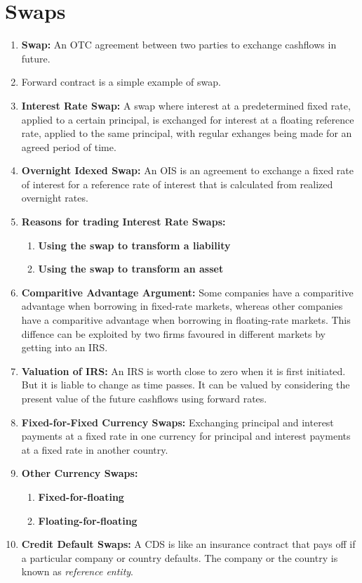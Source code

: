 
\section{Swaps}

\begin{enumerate}
    \item \textbf{Swap:} An OTC agreement between two parties to exchange cashflows in future.
    \item Forward contract is a simple example of swap.
    \item \textbf{Interest Rate Swap:} A swap where interest at a predetermined fixed rate, applied to a certain principal, is exchanged for interest at a floating reference rate, applied to the same principal, with regular exhanges being made for an agreed period of time.
    \item \textbf{Overnight Idexed Swap:} An OIS is an agreement to exchange a fixed rate of interest for a reference rate of interest that is calculated from realized overnight rates.
    \item \textbf{Reasons for trading Interest Rate Swaps:}
    \begin{enumerate}
        \item \textbf{Using the swap to transform a liability}
        \item \textbf{Using the swap to transform an asset}
    \end{enumerate}
    \item \textbf{Comparitive Advantage Argument:} Some companies have a comparitive advantage when borrowing in fixed-rate markets, whereas other companies have a comparitive advantage when borrowing in floating-rate markets. This diffence can be exploited by two firms favoured in different markets by getting into an IRS.
    \item \textbf{Valuation of IRS:} An IRS is worth close to zero when it is first initiated. But it is liable to change as time passes. It can be valued by considering the present value of the future cashflows using forward rates.
    \item \textbf{Fixed-for-Fixed Currency Swaps:} Exchanging principal and interest payments at a fixed rate in one currency for principal and interest payments at a fixed rate in another country.
    \item \textbf{Other Currency Swaps:}
    \begin{enumerate}
        \item \textbf{Fixed-for-floating}
        \item \textbf{Floating-for-floating}
    \end{enumerate}
    \item \textbf{Credit Default Swaps:} A CDS is like an insurance contract that pays off if a particular company or country defaults. The company or the country is known as \textit{reference entity}.
\end{enumerate}